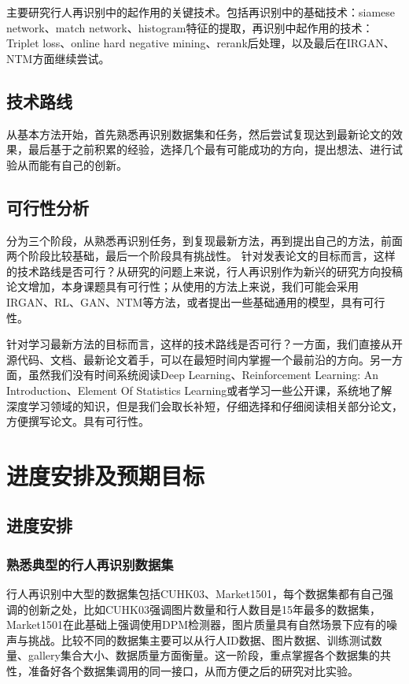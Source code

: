 主要研究行人再识别中的起作用的关键技术。包括再识别中的基础技术：siamese network、match network、histogram特征的提取，再识别中起作用的技术：Triplet loss、online hard negative mining、rerank后处理，以及最后在IRGAN、NTM方面继续尝试。

\subsection{技术路线}

从基本方法开始，首先熟悉再识别数据集和任务，然后尝试复现达到最新论文的效果，最后基于之前积累的经验，选择几个最有可能成功的方向，提出想法、进行试验从而能有自己的创新。

\subsection{可行性分析}

分为三个阶段，从熟悉再识别任务，到复现最新方法，再到提出自己的方法，前面两个阶段比较基础，最后一个阶段具有挑战性。
针对发表论文的目标而言，这样的技术路线是否可行？从研究的问题上来说，行人再识别作为新兴的研究方向投稿论文增加，本身课题具有可行性；从使用的方法上来说，我们可能会采用IRGAN、RL、GAN、NTM等方法，或者提出一些基础通用的模型，具有可行性。

针对学习最新方法的目标而言，这样的技术路线是否可行？一方面，我们直接从开源代码、文档、最新论文着手，可以在最短时间内掌握一个最前沿的方向。另一方面，虽然我们没有时间系统阅读Deep Learning、Reinforcement Learning: An Introduction、Element Of Statistics Learning或者学习一些公开课，系统地了解深度学习领域的知识，但是我们会取长补短，仔细选择和仔细阅读相关部分论文，方便撰写论文。具有可行性。

\section{进度安排及预期目标}

\subsection{进度安排}

\subsubsection{熟悉典型的行人再识别数据集}

行人再识别中大型的数据集包括CUHK03、Market1501，每个数据集都有自己强调的创新之处，比如CUHK03强调图片数量和行人数目是15年最多的数据集，Market1501在此基础上强调使用DPM检测器，图片质量具有自然场景下应有的噪声与挑战。比较不同的数据集主要可以从行人ID数据、图片数据、训练测试数量、gallery集合大小、数据质量方面衡量。这一阶段，重点掌握各个数据集的共性，准备好各个数据集调用的同一接口，从而方便之后的研究对比实验。

